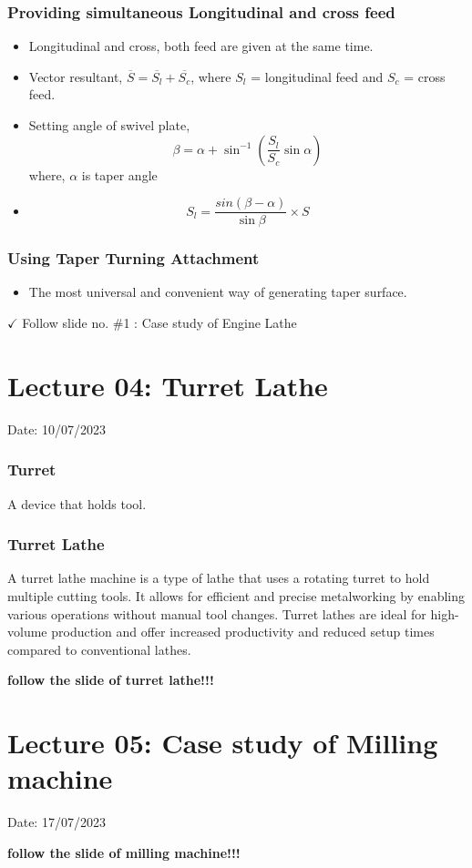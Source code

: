 \documentclass{article}
\begin{document}
\subsubsection*{Providing simultaneous Longitudinal and cross feed}
\begin{itemize}
  \item Longitudinal and cross, both feed are given at the same time.  
  \item Vector resultant, $\overline{S} = \overline{S_l} + \overline{S_c}$, where $S_l$ = longitudinal feed and $S_c$ = cross feed. 
  \item Setting angle of swivel plate, $$\beta = \alpha + \sin^{-1} \left(\frac{S_l}{S_c} \sin \alpha \right)$$ where, $\alpha$ is taper angle 
  \item $$S_l = \frac{sin \left(\beta - \alpha \right)}{\sin \beta} \times S $$
\end{itemize}

\subsubsection*{Using Taper Turning Attachment}
\begin{itemize}
  \item The most universal and convenient way of generating taper surface. 
\end{itemize}

\vspace*{1cm}
$\checkmark$ Follow slide no. \#1 : Case study of Engine Lathe 

\vspace*{1cm}

\section{Lecture 04: Turret Lathe} 
\hfill Date: 10/07/2023

\subsubsection*{Turret}
A device that holds tool. 

\subsubsection*{Turret Lathe}

A turret lathe machine is a type of lathe that uses a rotating turret to hold multiple cutting tools. It allows for efficient and precise metalworking by enabling various operations without manual tool changes. Turret lathes are ideal for high-volume production and offer increased productivity and reduced setup times compared to conventional lathes.

\vspace*{1cm} 
\textbf{follow the slide of turret lathe!!!}
\vspace*{1cm}

\section{Lecture 05: Case study of Milling machine} 
\hfill Date: 17/07/2023

\vspace*{1cm} 
\textbf{follow the slide of milling machine!!!}
\vspace*{1cm}
\end{document}
